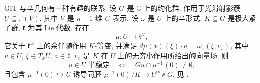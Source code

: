 \begin{remark}[辛约化]\label{src:8.2.12}
GIT 与辛几何有一种有趣的联系. 设 $G$ 是 $\mathbb C$ 上的约化群, 作用于光滑射影簇 $U\subseteq\mathbb P(V)$, 其中 $V$ 是 $n+1$ 维 $G$-表示. 设 $\omega$ 是 $U$ 上的辛形式, $K\subseteq G$ 是极大紧子群, $\mathfrak k$ 为其 Lie 代数. 存在
\[
\mu:U\longrightarrow\mathfrak k^\vee,
\]
它关于 $\mathfrak k^\vee$ 上的余伴随作用 $K$-等变, 并满足 $d\mu(x)(\xi)\cdot a=\omega_x(\xi,v_x)$, 其中 $u\in U$, $\xi\in T_xU$, $a\in\mathfrak k$, $v_x$ 是 $K$ 在 $U$ 上的无穷小作用所给出的向量场. 则
\[
u\in U\text{ 半稳定}\quad\Longleftrightarrow\quad\overline{Gu}\cap\mu^{-1}(0)\ne\emptyset,
\]
且包含 $\mu^{-1}(0)\hookrightarrow U$ 诱导同胚 $\mu^{-1}(0)/K\to U^{\mathrm{ss}}\sslash G$. 见 \cite[\S8]{MFK94}.
\end{remark}
